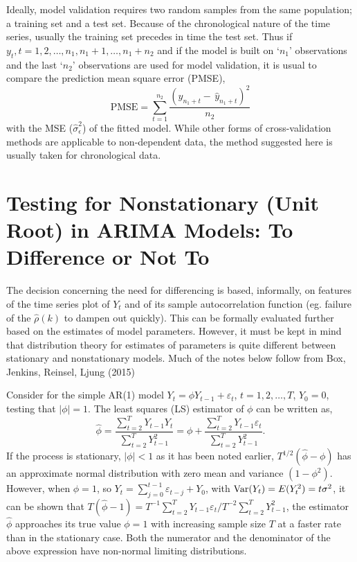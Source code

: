 Ideally, model validation requires two random samples from the same population; a training set and a test set. Because of the chronological nature of the time series, usually the training set precedes in time the test set. Thus if $y_t, t= 1,2, \ldots,n_1, n_1+1, \ldots, n_1+n_2$ and if the model is built on `$n_1$' observations and the last `$n_2$' observations are used for model validation, it is usual to compare the prediction mean square error (PMSE),
	\begin{equation} \label{eqn:pmse}
	\text{PMSE} = \sum_{t=1}^{n_2} \frac{(y_{n_1+t} - \,\hat{y}_{n_1+t})^2}{n_2}
	\end{equation}
with the MSE ($\hat{\sigma}_\epsilon^2$) of the fitted model. While other forms of cross-validation methods are applicable to non-dependent data, the method suggested here is usually taken for chronological data.



\section{Testing for Nonstationary (Unit Root) in ARIMA Models: To Difference or Not To \label{sec:diffornot}} 


The decision concerning the need for differencing is based, informally, on features of the time series plot of $Y_t$ and of its sample autocorrelation function (eg. failure of the $\hat{\rho}(k)$ to dampen out quickly). This can be formally evaluated further based on the estimates of model parameters. However, it must be kept in mind that distribution theory for estimates of parameters is quite different between stationary and nonstationary models. Much of the notes below follow from Box, Jenkins, Reinsel, Ljung (2015)~\cite{ljung15}


Consider for the simple AR(1) model $Y_t = \phi Y_{t-1} + \varepsilon_t$, $t = 1,2, \ldots, T$, $Y_0 = 0$, testing that $|\phi| = 1$. The least squares (LS) estimator of $\phi$ can be written as,
	\begin{equation} \label{eqn:futurereffirst}
	\hat{\phi} = \dfrac{\sum_{t=2}^T Y_{t-1}Y_t}{\sum_{t=2}^T Y_{t-1}^2} = \phi + \dfrac{\sum_{t=2}^T Y_{t-1}\varepsilon_t}{\sum_{t=2}^T Y_{t-1}^2}.
	\end{equation}
If the process is stationary, $\lvert \phi \rvert< 1$ as it has been noted earlier, $T^{1/2}(\hat{\phi} - \phi)$ has an approximate normal distribution with zero mean and variance $(1 - \phi^2)$. However, when $\phi = 1$, so $Y_t = \sum_{j=0}^{t-1}\varepsilon_{t-j} + Y_0$, with $\operatorname{Var}(Y_t) = E(Y_t^2) = t \sigma^2$, it can be shown that $T(\hat{\phi} - 1) = T^{-1} \sum_{t=2}^T Y_{t-1} \varepsilon_t/T^{-2} \sum_{t=2}^T Y_{t-1}^2$, the estimator $\hat{\phi}$ approaches its true value $\phi = 1$ with increasing sample size $T$ at a faster rate than in the stationary case. Both the numerator and the denominator of the above expression have non-normal limiting distributions. 


